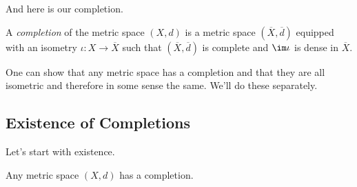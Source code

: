\documentclass[../notes.tex]{subfiles}
\begin{document}
And here is our completion.
\begin{definition}[Completion]
	A \textit{completion} of the metric space $(X,d)$ is a metric space $(\overline X,\overline d)$ equipped with an isometry $\iota\colon X\to\overline X$ such that $(\overline X,\overline d)$ is complete and $\im\iota$ is dense in $\overline X$.
\end{definition}
One can show that any metric space has a completion and that they are all isometric and therefore in some sense the same. We'll do these separately.

\subsection{Existence of Completions}
Let's start with existence.
\begin{theorem}
	Any metric space $(X,d)$ has a completion.
\end{theorem}
\end{document}
